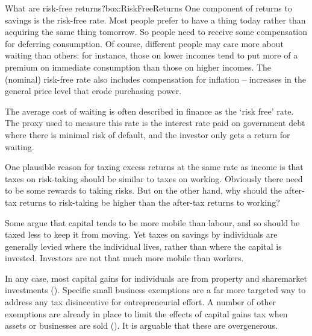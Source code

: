 \begin{verysmallbox}[!b]{What are risk-free returns?}{box:RiskFreeReturns}
\vspace{0pt}
One component of returns to savings is the risk-free rate. Most people prefer to have a thing today rather than acquiring the same thing tomorrow. So people need to receive some compensation for deferring consumption. Of course, different people may care more about waiting than others: for instance, those on lower incomes tend to put more of a premium on immediate consumption than those on higher incomes.   The (nominal) risk-free rate also includes compensation for inflation – increases in the general price level that erode purchasing power. 

The average cost of waiting is often described in finance as the ‘risk free’ rate. The proxy used to measure this rate is the interest rate paid on government debt where there is minimal risk of default, and the investor only gets a return for waiting. 
\end{verysmallbox}

One plausible reason for taxing excess returns at the same rate as income is that taxes on risk-taking should be similar to taxes on working. Obviously there need to be some rewards to taking risks. But on the other hand, why should the after-tax returns to risk-taking be higher than the after-tax returns to working? 

Some argue that capital tends to be more mobile than labour, and so should be taxed less to keep it from moving. Yet taxes on savings by individuals are generally levied where the individual lives, rather than where the capital is invested. Investors are not that much more mobile than workers.

In any case, most capital gains for individuals are from property and sharemarket investments (). Specific small business exemptions are a far more targeted way to address any tax disincentive for entrepreneurial effort. A number of other exemptions are already in place to limit the effects of capital gains tax when assets or businesses are sold (). It is arguable that these are overgenerous. 

